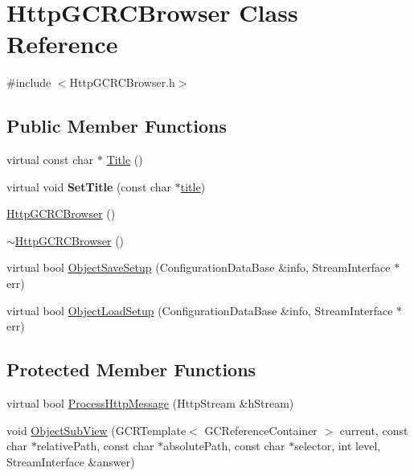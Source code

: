 \hypertarget{classHttpGCRCBrowser}{
\section{HttpGCRCBrowser Class Reference}
\label{classHttpGCRCBrowser}
}


{\ttfamily \#include $<$HttpGCRCBrowser.h$>$}

\subsection*{Public Member Functions}
\begin{DoxyCompactItemize}
\item 
virtual const char $\ast$ \hyperlink{classHttpGCRCBrowser_a7c92191d1e87a9dc6ec09981be496fd1}{Title} ()
\item 
\hypertarget{classHttpGCRCBrowser_aa1aecf3ed830811a3fe6cbc156c07070}{
virtual void {\bfseries SetTitle} (const char $\ast$\hyperlink{classHttpGCRCBrowser_a6c59a7dfbebcc1939a60fe4d379630a7}{title})}
\label{classHttpGCRCBrowser_aa1aecf3ed830811a3fe6cbc156c07070}

\item 
\hyperlink{classHttpGCRCBrowser_a311b5a73c2444740ad635e3563ec202b}{HttpGCRCBrowser} ()
\item 
\hyperlink{classHttpGCRCBrowser_a28ae6e58aa3dbccd438ac827d1f25ec4}{$\sim$HttpGCRCBrowser} ()
\item 
virtual bool \hyperlink{classHttpGCRCBrowser_ab18338af4c81014e455b7b563e8e4a7e}{ObjectSaveSetup} (ConfigurationDataBase \&info, StreamInterface $\ast$err)
\item 
virtual bool \hyperlink{classHttpGCRCBrowser_ad2e25b201c478115c72d2c1529069360}{ObjectLoadSetup} (ConfigurationDataBase \&info, StreamInterface $\ast$err)
\end{DoxyCompactItemize}
\subsection*{Protected Member Functions}
\begin{DoxyCompactItemize}
\item 
virtual bool \hyperlink{classHttpGCRCBrowser_a3f93d5e83175c5ebaf8d8811cbfe1828}{ProcessHttpMessage} (HttpStream \&hStream)
\item 
void \hyperlink{classHttpGCRCBrowser_abca6ebb2d9a86a3c2ef6da34719fbe15}{ObjectSubView} (GCRTemplate$<$ GCReferenceContainer $>$ current, const char $\ast$relativePath, const char $\ast$absolutePath, const char $\ast$selector, int level, StreamInterface \&answer)
\end{DoxyCompactItemize}
